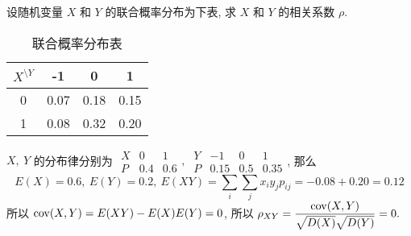 \begin{example}
    设随机变量 $X$ 和 $Y$ 的联合概率分布为下表, 求 $X$ 和 $Y$ 的相关系数 $\rho.$
\end{example}
\begin{solution}
    \begin{minipage}{0.3\linewidth}
        \begin{table}[H]
            \centering
            \caption*{联合概率分布表}
            \begin{tabular}{c | c c c}
                $X^{\displaystyle\setminus Y}$ & -1   & 0    & 1    \\
                \midrule
                0                              & 0.07 & 0.18 & 0.15 \\
                1                              & 0.08 & 0.32 & 0.20
            \end{tabular}
        \end{table}
    \end{minipage}\hfill
    \begin{minipage}{0.66\linewidth}
        $X,~Y$ 的分布律分别为 $\begin{array}{c|cc}
                X & 0   & 1   \\\hline
                P & 0.4 & 0.6
            \end{array},~\begin{array}{c|ccc}
                Y & -1   & 0   & 1    \\\hline
                P & 0.15 & 0.5 & 0.35
            \end{array}$, 那么
        $$E(X)=0.6,~E(Y)=0.2,~E(XY)=\sum_i\sum_j x_iy_j p_{ij}=-0.08+0.20=0.12$$
        所以 $\mathrm{cov}(X,Y)=E(XY)-E(X)E(Y)=0$, 所以 $\rho_{XY}=\dfrac{\mathrm{cov}(X,Y)}{\sqrt{D(X)}\sqrt{D(Y)}}=0.$
    \end{minipage}
\end{solution}

